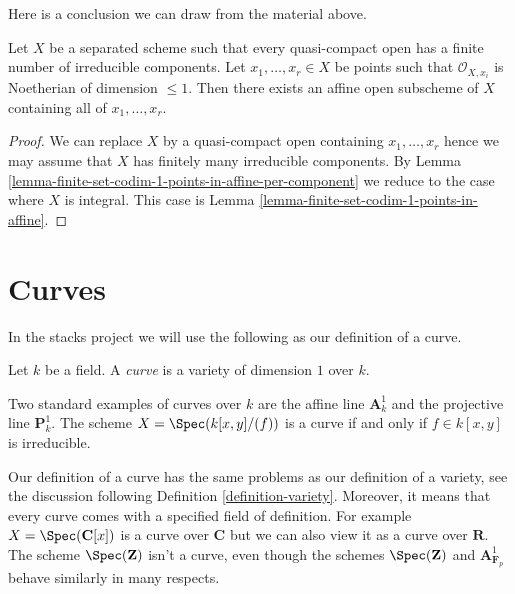 \noindent
Here is a conclusion we can draw from the material above.

\begin{proposition}
\label{proposition-finite-set-of-points-of-codim-1-in-affine}
Let $X$ be a separated scheme such that every quasi-compact open
has a finite number of irreducible components. Let $x_1, \ldots, x_r \in X$
be points such that $\mathcal{O}_{X, x_i}$ is Noetherian
of dimension $\leq 1$. Then there exists an affine open subscheme
of $X$ containing all of $x_1, \ldots, x_r$.
\end{proposition}

\begin{proof}
We can replace $X$ by a quasi-compact open containing $x_1, \ldots, x_r$
hence we may assume that $X$ has finitely many irreducible components.
By Lemma \ref{lemma-finite-set-codim-1-points-in-affine-per-component}
we reduce to the case where $X$ is integral. This case is
Lemma \ref{lemma-finite-set-codim-1-points-in-affine}.
\end{proof}





\section{Curves}
\label{section-curves}

\noindent
In the stacks project we will use the following as our definition
of a curve.

\begin{definition}
\label{definition-curve}
Let $k$ be a field. A {\it curve} is a variety of dimension $1$ over $k$.
\end{definition}

\noindent
Two standard examples of curves over $k$ are the affine line $\mathbf{A}^1_k$
and the projective line $\mathbf{P}^1_k$. The scheme $X = \Spec(k[x, y]/(f))$
is a curve if and only if $f \in k[x, y]$ is irreducible.

\medskip\noindent
Our definition of a curve has the same problems as our definition of a
variety, see the discussion following Definition \ref{definition-variety}.
Moreover, it means that every curve comes with a specified field of definition.
For example $X = \Spec(\mathbf{C}[x])$ is a curve over $\mathbf{C}$
but we can also view it as a curve over $\mathbf{R}$. The scheme
$\Spec(\mathbf{Z})$ isn't a curve, even though the schemes $\Spec(\mathbf{Z})$
and $\mathbf{A}^1_{\mathbf{F}_p}$ behave similarly in many respects.

